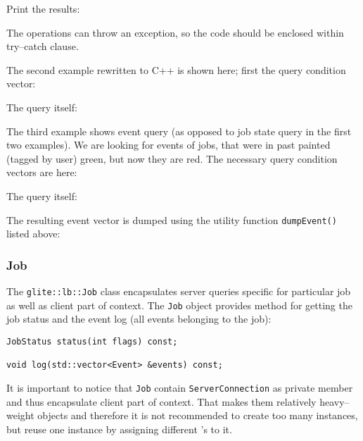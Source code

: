 Print the results:


The operations can throw an exception, so the code should be enclosed
within try--catch clause.

The second example rewritten to C++ is shown here; first the query
condition vector:


The query itself:


The third example shows event query (as opposed to job state query in
the first two examples). We are looking for events of jobs, that were
in past painted (tagged by user) green, but now they are red. The
necessary query condition vectors are here:


The query itself:


The resulting event vector is dumped using the utility function
\verb'dumpEvent()' listed above:



\subsubsection{Job}
The \verb'glite::lb::Job' class encapsulates \LB server queries
specific for particular job as well as client part of context. The
\verb'Job' object provides method for getting the job status and the
event log (\ie all events belonging to the job):
\begin{lstlisting}
JobStatus status(int flags) const;

void log(std::vector<Event> &events) const;
\end{lstlisting}

%
It is important to notice that \verb'Job' contain
\verb'ServerConnection' as private member and thus encapsulate client
part of context. That makes them relatively heavy--weight objects and
therefore it is not recommended to create too many instances, but
reuse one instance by assigning different \jobid's to it.



